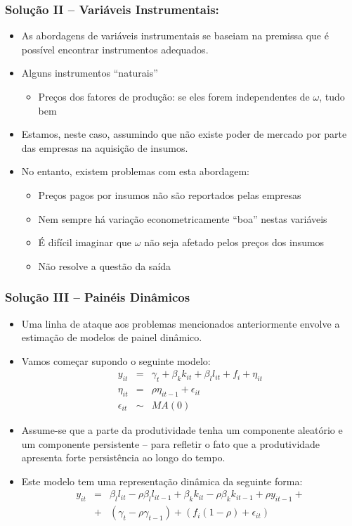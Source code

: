 \documentclass{beamer}
\begin{document}
\begin{frame}\frametitle{Solução II -- Variáveis Instrumentais:}

\begin{itemize}
\item As abordagens de variáveis instrumentais se baseiam na premissa que
é possível encontrar instrumentos adequados.
\item Alguns instrumentos ``naturais''

\begin{itemize}
\item Preços dos fatores de produção: se eles forem independentes de $\omega$,
tudo bem
\end{itemize}
\item Estamos, neste caso, assumindo que não existe poder de mercado por
parte das empresas na aquisição de insumos.
\item No entanto, existem problemas com esta abordagem:

\begin{itemize}
\item Preços pagos por insumos não são reportados pelas empresas
\item Nem sempre há variação econometricamente ``boa'' nestas variáveis
\item É difícil imaginar que $\omega$ não seja afetado pelos preços dos
insumos
\item Não resolve a questão da saída
\end{itemize}
\end{itemize}
\end{frame}

\begin{frame}\frametitle{Solução III -- Painéis Dinâmicos}
\small
\begin{itemize}
\item Uma linha de ataque aos problemas mencionados anteriormente envolve
a estimação de modelos de painel dinâmico. 
\item Vamos começar supondo o seguinte modelo:
\begin{eqnarray*}
y_{it} & = & \gamma_{t}+\beta_{k}k_{it}+\beta_{l}l_{it}+f_{i}+\eta_{it}\\
\eta_{it} & = & \rho\eta_{it-1}+\epsilon_{it}\\
\epsilon_{it} & \sim & MA(0)
\end{eqnarray*}
\item Assume-se que a parte da produtividade tenha um componente aleatório
e um componente persistente -- para refletir o fato que
a produtividade apresenta forte persistência ao longo do tempo.
\item Este modelo tem uma representação dinâmica da seguinte forma:
\begin{eqnarray*}
y_{it} & = & \beta_{l}l_{it}-\rho\beta_{l}l_{it-1}+\beta_{k}k_{it}-\rho\beta_{k}k_{it-1}+\rho y_{it-1}+\\
 & + & (\gamma_{t}-\rho\gamma_{t-1})+(f_{i}(1-\rho)+\epsilon_{it})
\end{eqnarray*}
\end{itemize}
\end{frame}
\end{document}
